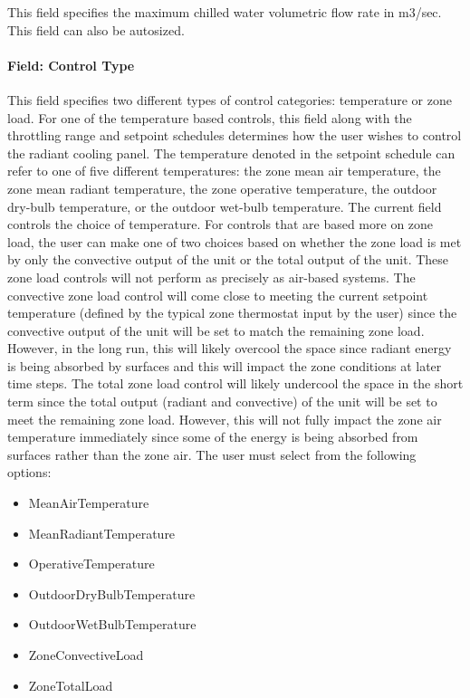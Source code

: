 This field specifies the maximum chilled water volumetric flow rate in m3/sec.  This field can also be autosized.

\paragraph{Field: Control Type}\label{field-control-type}

This field specifies two different types of control categories: temperature or zone load.  For one of the temperature based controls, this field along with the throttling range and setpoint schedules determines how the user wishes to control the radiant cooling panel.  The temperature denoted in the setpoint schedule can refer to one of five different temperatures: the zone mean air temperature, the zone mean radiant temperature, the zone operative temperature, the outdoor dry-bulb temperature, or the outdoor wet-bulb temperature.  The current field controls the choice of temperature.  For controls that are based more on zone load, the user can make one of two choices based on whether the zone load is met by only the convective output of the unit or the total output of the unit.  These zone load controls will not perform as precisely as air-based systems.  The convective zone load control will come close to meeting the current setpoint temperature (defined by the typical zone thermostat input by the user) since the convective output of the unit will be set to match the remaining zone load.  However, in the long run, this will likely overcool the space since radiant energy is being absorbed by surfaces and this will impact the zone conditions at later time steps.  The total zone load control will likely undercool the space in the short term since the total output (radiant and convective) of the unit will be set to meet the remaining zone load.  However, this will not fully impact the zone air temperature immediately since some of the energy is being absorbed from surfaces rather than the zone air.  The user must select from the following options:

\begin{itemize}
\tightlist
\item
  MeanAirTemperature
\item
  MeanRadiantTemperature
\item
  OperativeTemperature
\item
  OutdoorDryBulbTemperature
\item
  OutdoorWetBulbTemperature
\item
  ZoneConvectiveLoad
\item
  ZoneTotalLoad
\end{itemize}


